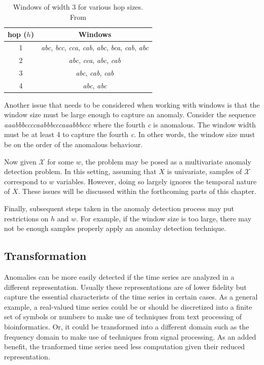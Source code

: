 \begin{table}[h]
  \centering
  \begin{tabular}{|c|c|}
    \hline
    hop ($h$) & Windows \\
    \hline
    \hline
    1 & \emph{abc},
        \emph{bcc}, 
        \emph{cca}, 
        \emph{cab},
        \emph{abc}, 
        \emph{bca},
        \emph{cab},
        \emph{abc} \\
    \hline
    2 & \emph{abc},
        \emph{cca},
        \emph{abc},
        \emph{cab} \\
    \hline
    3 & \emph{abc}, 
        \emph{cab},
        \emph{cab} \\
    \hline
    4 & \emph{abc}, 
        \emph{abc} \\
    \hline
  \end{tabular}
  \caption{Windows of width 3 for various hop sizes. From \cite{Cheboli2010}}
  \label{tbl:hop}
\end{table}

Another issue that needs to be considered when working with windows is that the window size must be large enough to capture an anomaly. Consider the sequence \emph{aaabbbccccaabbbcccaaabbbccc} where the fourth \emph{c} is anomalous. The window width must be at least 4 to capture the fourth \emph{c}. In other words, the window size must be on the order of the anomalous behaviour.

Now given $\mathcal{X}$ for some $w$, the problem may be posed as a multivariate anomaly detection problem. In this setting, assuming that $X$ is univariate, samples of $\mathcal{X}$ correspond to $w$ variables. However, doing so largely ignores the temporal nature of $X$. These issues will be discussed within the forthcoming parts of this chapter.

Finally, subsequent steps taken in the anomaly detection process may put restrictions on $h$ and $w$. For example, if the window size is too large, there may not be enough samples properly apply an anomlay detection technique.

\subsection{Transformation}

Anomalies can be more easily detected if the time series are analyzed in a different representation. Usually these representations are of lower fidelity but capture the essential characterists of the time series in certain cases. As a general example, a real-valued time series could be or should be discretized into a finite set of symbols or numbers to make use of techniques from text processing of bioinformatics. Or, it could be transformed into a different domain such as the frequency domain to make use of techniques from signal processing. As an added benefit, the tranformed time series need less computation given their reduced representation.

